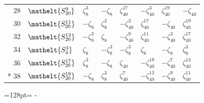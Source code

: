 \documentclass[10pt,a4paper]{article}
\newcommand{\needspace}[1]{\par\penalty-100\begingroup\dimen0=#1\relax\dimen2=\pagegoal
  \advance\dimen2-\pagetotal\ifdim\dimen0>\dimen2\relax\ifdim\dimen2>0pt\vfil\break\fi\fi
  \endgroup}
\numberwithin{equation}{section}
\newcommand{\eltfont}[1]{{\let\sigma\eltsigma\mathelt{#1}}}
\newcommand{\cls}[1]{\eltfont{#1}}
\newcommand{\rootunity}[1]{\zeta_{#1}}
\begin{document}
{\begin{longtable}{@{}rlllllll@{}}
28 & $\cls{S_{20}^{9}}$ & $\rootunity{8}^{3}$ & $-\rootunity{8}$ & $\rootunity{40}^{17}$ & $-\rootunity{40}^{3}$ & $\rootunity{40}^{19}$ & $-\rootunity{40}$\\
30 & $\cls{S_{20}^{11}}$ & $-\rootunity{8}$ & $\rootunity{8}^{3}$ & $-\rootunity{40}^{3}$ & $\rootunity{40}^{17}$ & $-\rootunity{40}$ & $\rootunity{40}^{19}$\\
32 & $\cls{S_{20}^{13}}$ & $-\rootunity{8}^{3}$ & $\rootunity{8}$ & $-\rootunity{40}^{9}$ & $\rootunity{40}^{11}$ & $-\rootunity{40}^{3}$ & $\rootunity{40}^{17}$\\
34 & $\cls{S_{4}^{3}}$ & $\rootunity{8}$ & $-\rootunity{8}^{3}$ & $-\rootunity{8}^{3}$ & $\rootunity{8}$ & $-\rootunity{8}$ & $\rootunity{8}^{3}$\\
36 & $\cls{S_{20}^{17}}$ & $\rootunity{8}^{3}$ & $-\rootunity{8}$ & $\rootunity{40}$ & $-\rootunity{40}^{19}$ & $-\rootunity{40}^{7}$ & $\rootunity{40}^{13}$\\*
38 & $\cls{S_{20}^{19}}$ & $-\rootunity{8}$ & $\rootunity{8}^{3}$ & $\rootunity{40}^{7}$ & $-\rootunity{40}^{13}$ & $-\rootunity{40}^{9}$ & $\rootunity{40}^{11}$\\
\bottomrule\end{longtable}}
\needspace{128pt}
\end{document}
